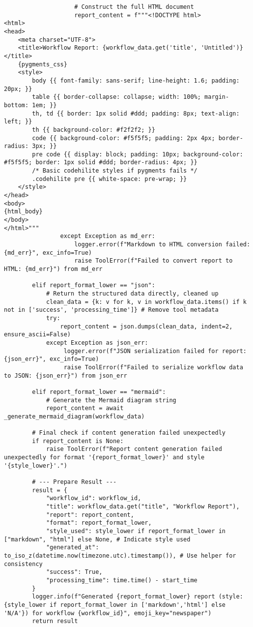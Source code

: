 \documentclass[12pt,a4paper]{article}
\begin{document}
\begin{pageablecode}
\begin{verbatim}
                    # Construct the full HTML document
                    report_content = f"""<!DOCTYPE html>
<html>
<head>
    <meta charset="UTF-8">
    <title>Workflow Report: {workflow_data.get('title', 'Untitled')}</title>
    {pygments_css}
    <style>
        body {{ font-family: sans-serif; line-height: 1.6; padding: 20px; }}
        table {{ border-collapse: collapse; width: 100%; margin-bottom: 1em; }}
        th, td {{ border: 1px solid #ddd; padding: 8px; text-align: left; }}
        th {{ background-color: #f2f2f2; }}
        code {{ background-color: #f5f5f5; padding: 2px 4px; border-radius: 3px; }}
        pre code {{ display: block; padding: 10px; background-color: #f5f5f5; border: 1px solid #ddd; border-radius: 4px; }}
        /* Basic codehilite styles if pygments fails */
        .codehilite pre {{ white-space: pre-wrap; }}
    </style>
</head>
<body>
{html_body}
</body>
</html>"""
                except Exception as md_err:
                    logger.error(f"Markdown to HTML conversion failed: {md_err}", exc_info=True)
                    raise ToolError(f"Failed to convert report to HTML: {md_err}") from md_err

        elif report_format_lower == "json":
            # Return the structured data directly, cleaned up
            clean_data = {k: v for k, v in workflow_data.items() if k not in ['success', 'processing_time']} # Remove tool metadata
            try:
                report_content = json.dumps(clean_data, indent=2, ensure_ascii=False)
            except Exception as json_err:
                 logger.error(f"JSON serialization failed for report: {json_err}", exc_info=True)
                 raise ToolError(f"Failed to serialize workflow data to JSON: {json_err}") from json_err

        elif report_format_lower == "mermaid":
            # Generate the Mermaid diagram string
            report_content = await _generate_mermaid_diagram(workflow_data)

        # Final check if content generation failed unexpectedly
        if report_content is None:
            raise ToolError(f"Report content generation failed unexpectedly for format '{report_format_lower}' and style '{style_lower}'.")

        # --- Prepare Result ---
        result = {
            "workflow_id": workflow_id,
            "title": workflow_data.get("title", "Workflow Report"),
            "report": report_content,
            "format": report_format_lower,
            "style_used": style_lower if report_format_lower in ["markdown", "html"] else None, # Indicate style used
            "generated_at": to_iso_z(datetime.now(timezone.utc).timestamp()), # Use helper for consistency
            "success": True,
            "processing_time": time.time() - start_time
        }
        logger.info(f"Generated {report_format_lower} report (style: {style_lower if report_format_lower in ['markdown','html'] else 'N/A'}) for workflow {workflow_id}", emoji_key="newspaper")
        return result


\end{verbatim}
\end{pageablecode}
\end{document}
